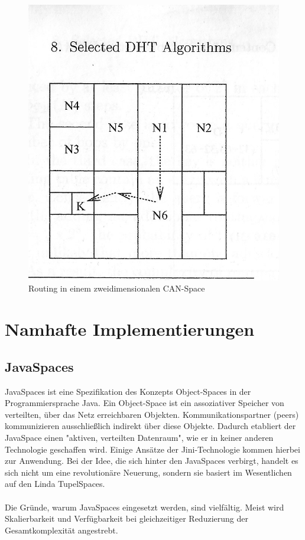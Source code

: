 \documentclass[a4paper,12pt]{scrreprt}
\begin{document}
					\begin{figure}
						\centering
						\includegraphics[width=0.55\linewidth]{./graphics/CAN_Routing}
						\caption{Routing in einem zweidimensionalen CAN-Space}
						\label{fig:CAN_Routing}
					\end{figure}
					 
\chapter{Namhafte Implementierungen}
	\section{JavaSpaces}
		JavaSpaces ist eine Spezifikation des Konzepts Object-Spaces in der Programmiersprache Java. Ein Object-Space ist ein assoziativer Speicher von verteilten, über das Netz erreichbaren Objekten. Kommunikationspartner (peers) kommunizieren ausschließlich indirekt über diese Objekte. Dadurch etabliert der JavaSpace einen "aktiven, verteilten Datenraum", wie er in keiner anderen Technologie geschaffen wird. Einige Ansätze der Jini-Technologie kommen hierbei zur Anwendung. Bei der Idee, die sich hinter den JavaSpaces verbirgt, handelt es sich nicht um eine revolutionäre Neuerung, sondern sie basiert im Wesentlichen auf den Linda TupelSpaces.\\\\	
		Die Gründe, warum JavaSpaces eingesetzt werden, sind vielfältig. Meist wird Skalierbarkeit und Verfügbarkeit bei gleichzeitiger Reduzierung der Gesamtkomplexität angestrebt.
		
		
\end{document}
